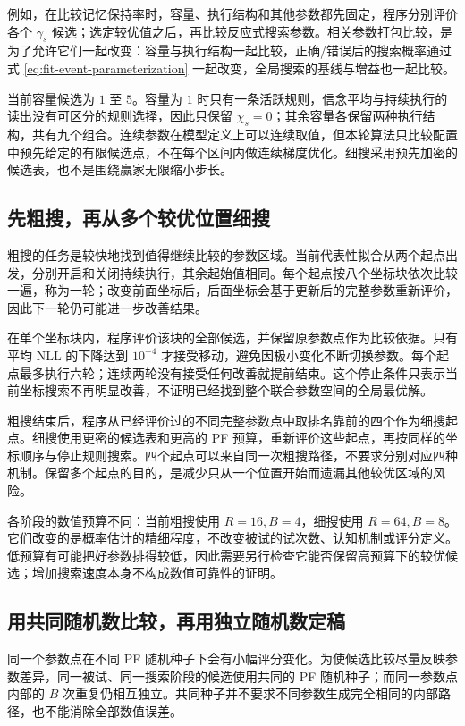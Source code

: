 \documentclass[12pt]{article}
\begin{document}
例如，在比较记忆保持率时，容量、执行结构和其他参数都先固定，程序分别评价各个 $\gamma_s$ 候选；选定较优值之后，再比较反应式搜索参数。相关参数打包比较，是为了允许它们一起改变：容量与执行结构一起比较，正确/错误后的搜索概率通过式 \eqref{eq:fit-event-parameterization} 一起改变，全局搜索的基线与增益也一起比较。

当前容量候选为 $1$ 至 $5$。容量为 $1$ 时只有一条活跃规则，信念平均与持续执行的读出没有可区分的规则选择，因此只保留 $\chi_s=0$；其余容量各保留两种执行结构，共有九个组合。连续参数在模型定义上可以连续取值，但本轮算法只比较配置中预先给定的有限候选点，不在每个区间内做连续梯度优化。细搜采用预先加密的候选表，也不是围绕赢家无限缩小步长。

\subsection{先粗搜，再从多个较优位置细搜}

粗搜的任务是较快地找到值得继续比较的参数区域。当前代表性拟合从两个起点出发，分别开启和关闭持续执行，其余起始值相同。每个起点按八个坐标块依次比较一遍，称为一轮；改变前面坐标后，后面坐标会基于更新后的完整参数重新评价，因此下一轮仍可能进一步改善结果。

在单个坐标块内，程序评价该块的全部候选，并保留原参数点作为比较依据。只有平均 NLL 的下降达到 $10^{-4}$ 才接受移动，避免因极小变化不断切换参数。每个起点最多执行六轮；连续两轮没有接受任何改善就提前结束。这个停止条件只表示当前坐标搜索不再明显改善，不证明已经找到整个联合参数空间的全局最优解。

粗搜结束后，程序从已经评价过的不同完整参数点中取排名靠前的四个作为细搜起点。细搜使用更密的候选表和更高的 PF 预算，重新评价这些起点，再按同样的坐标顺序与停止规则搜索。四个起点可以来自同一次粗搜路径，不要求分别对应四种机制。保留多个起点的目的，是减少只从一个位置开始而遗漏其他较优区域的风险。

各阶段的数值预算不同：当前粗搜使用 $R=16,B=4$，细搜使用 $R=64,B=8$。它们改变的是概率估计的精细程度，不改变被试的试次数、认知机制或评分定义。低预算有可能把好参数排得较低，因此需要另行检查它能否保留高预算下的较优候选；增加搜索速度本身不构成数值可靠性的证明。

\subsection{用共同随机数比较，再用独立随机数定稿}

同一个参数点在不同 PF 随机种子下会有小幅评分变化。为使候选比较尽量反映参数差异，同一被试、同一搜索阶段的候选使用共同的 PF 随机种子；而同一参数点内部的 $B$ 次重复仍相互独立。共同种子并不要求不同参数生成完全相同的内部路径，也不能消除全部数值误差。
\end{document}
